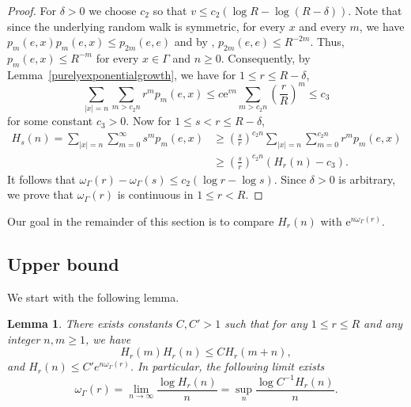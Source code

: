 \documentclass{amsart}
\newtheorem{lem}[thm]{Lemma}
\theoremstyle{definition}
\theoremstyle{remark}
\begin{document}
\begin{proof}
  For $\delta > 0$ we choose $c_2$ so that $v \le c_2 \left( \log R - \log (R - \delta) \right)$.
  Note that since the underlying random walk is symmetric, for every $x$ and every $m$, we have
  $p_m(e,x)p_m(e,x)\leq p_{2m}(e,e)$ and by \cite[Lemma~1.9]{Woessbook}, $p_{2m}(e,e)\leq R^{-2m}$.
  Thus,
  $p_m(e, x) \leq R^{-m}$ for every $x \in \Gamma$ and $n \ge 0$.
  Consequently, by Lemma~\ref{purelyexponentialgrowth}, we have for $1 \le r \le R - \delta$,
\[
\sum_{|x| = n} \sum_{m > c_2 n} r^m p_m(e, x) \le c\mathrm{e}^{v n} \sum_{m > c_2 n} \left( \frac{r}{R} \right)^m \le c_3 
\]
for some constant $c_3 > 0$. Now for $1 \le s < r \le R - \delta$,
\begin{align*}
      H_s(n) = \sum_{|x| = n} \sum_{m = 0}^{\infty} s^m p_m(e, x)
  &\ge \left( \frac{s}{r} \right)^{c_2 n} \sum_{|x| = n} \sum_{m = 0}^{c_2 n} r^m p_m(e, x)\\
  &\ge \left( \frac{s}{r} \right)^{c_2 n} \left( H_r(n) - c_3 \right). 
\end{align*}
It follows that $\omega_{\Gamma}(r) - \omega_\Gamma(s) \le c_2 \left( \log r - \log s \right)$. Since $\delta > 0$ is arbitrary, we prove that $\omega_{\Gamma}(r)$ is continuous in $1 \le r < R$.
\end{proof}


Our goal in the remainder of this section is to compare $H_r(n)$ with $\mathrm{e}^{n \omega_\Gamma(r)}$.

\subsection{Upper bound} 
We start with the following lemma.

\begin{lem}\label{UpperBDLem}
There exists  constants $C,C'>1$ such that for any $1\le r\le R$ and any  integer $n, m\ge 1$, we have
$$H_r(m) H_r(n) \le C H_{r}(m+n) ,$$
 and $H_r(n)\le C' e^{n \omega_\Gamma(r)}$. 
In particular, the following limit exists
$$\omega_\Gamma(r)= \lim_{n\to \infty} \frac{\log H_r(n)}{n}=\sup_n \frac{\log C^{-1}H_r(n)}{n}.$$
\end{lem}
\end{document}
